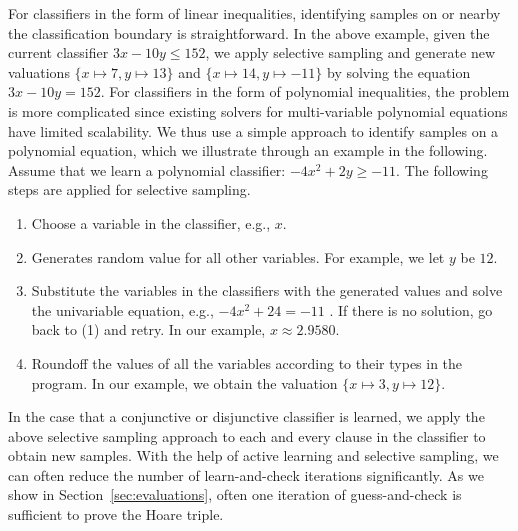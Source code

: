 For classifiers in the form of linear inequalities, identifying samples on or nearby the classification boundary is straightforward. In the above example, given the current classifier $3x-10y \leq 152$, we apply selective sampling and generate new valuations $\{x \mapsto 7, y \mapsto 13\}$ and $\{x \mapsto 14, y \mapsto -11\}$ by solving the equation $3x-10y = 152$. For classifiers in the form of polynomial inequalities, the problem is more complicated since existing solvers for multi-variable polynomial equations have limited scalability. We thus use a simple approach to identify samples on a polynomial equation, which we illustrate through an example in the following. Assume that we learn a polynomial classifier: $-4x^2+2y \geq -11$. The following steps are applied for selective sampling.
\begin{enumerate}
\item Choose a variable in the classifier, e.g., $x$.
\item Generates random value for all other variables. For example, we let $y$ be $12$.
\item Substitute the variables in the classifiers with the generated values and solve the univariable equation, e.g., $-4x^2+24 = -11$ . If there is no solution, go back to (1) and retry.
In our example, $x \approx 2.9580$.
\item Roundoff the values of all the variables according to their types in the program. In our example, we obtain the valuation $\{x \mapsto 3, y \mapsto 12\}$.
\end{enumerate}
In the case that a conjunctive or disjunctive classifier is learned, we apply the above selective sampling approach to each and every clause in the classifier to obtain new samples. With the help of active learning and selective sampling, we can often reduce the number of learn-and-check iterations significantly. As we show in Section~\ref{sec:evaluations}, often one iteration of guess-and-check is sufficient to prove the Hoare triple.


